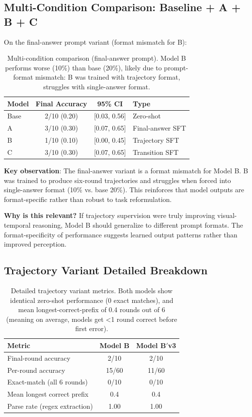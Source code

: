 \subsection{Multi-Condition Comparison: Baseline + A + B + C}

On the final-answer prompt variant (format mismatch for B):

\begin{table}[h]
\centering
\begin{tabular}{lccl}
\toprule
\textbf{Model} & \textbf{Final Accuracy} & \textbf{95\% CI} & \textbf{Type} \\
\midrule
Base & 2/10 (0.20) & [0.03, 0.56] & Zero-shot \\
A & 3/10 (0.30) & [0.07, 0.65] & Final-answer SFT \\
B & 1/10 (0.10) & [0.00, 0.45] & Trajectory SFT \\
C & 3/10 (0.30) & [0.07, 0.65] & Transition SFT \\
\bottomrule
\end{tabular}
\caption{\label{tab:multimodel} Multi-condition comparison (final-answer prompt). Model B performs worse (10\%) than base (20\%), likely due to prompt-format mismatch: B was trained with trajectory format, struggles with single-answer format.}
\end{table}

\textbf{Key observation}: The final-answer variant is a format mismatch for Model B. B was trained to produce six-round trajectories and struggles when forced into single-answer format (10\% vs. base 20\%). This reinforces that model outputs are format-specific rather than robust to task reformulation.

\textbf{Why is this relevant?} If trajectory supervision were truly improving visual-temporal reasoning, Model B should generalize to different prompt formats. The format-specificity of performance suggests learned output patterns rather than improved perception.

\subsection{Trajectory Variant Detailed Breakdown}

\begin{table}[h]
\centering
\begin{tabular}{lcc}
\toprule
\textbf{Metric} & \textbf{Model B} & \textbf{Model B$'$v3} \\
\midrule
Final-round accuracy & 2/10 & 2/10 \\
Per-round accuracy & 15/60 & 11/60 \\
Exact-match (all 6 rounds) & 0/10 & 0/10 \\
Mean longest correct prefix & 0.4 & 0.4 \\
Parse rate (regex extraction) & 1.00 & 1.00 \\
\bottomrule
\end{tabular}
\caption{\label{tab:trajectory_detail} Detailed trajectory variant metrics. Both models show identical zero-shot performance (0 exact matches), and mean longest-correct-prefix of 0.4 rounds out of 6 (meaning on average, models get <1 round correct before first error).}
\end{table}

